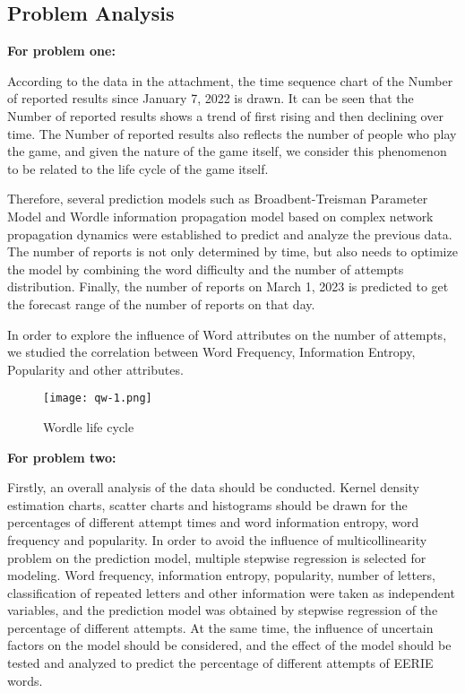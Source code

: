 \documentclass{mcmthesis}
\begin{document}
\subsection{Problem Analysis}

\textbf {For problem one:}

According to the data in the attachment, the time sequence chart of the Number of reported results since January 7, 2022 is drawn. It can be seen that the Number of reported results shows a trend of first rising and then declining over time. The Number of reported results also reflects the number of people who play the game, and given the nature of the game itself, we consider this phenomenon to be related to the life cycle of the game itself.

Therefore, several prediction models such as Broadbent-Treisman Parameter Model and Wordle information propagation model based on complex network propagation dynamics were established to predict and analyze the previous data. The number of reports is not only determined by time, but also needs to optimize the model by combining the word difficulty and the number of attempts distribution. Finally, the number of reports on March 1, 2023 is predicted to get the forecast range of the number of reports on that day.

In order to explore the influence of Word attributes on the number of attempts, we studied the correlation between Word Frequency, Information Entropy, Popularity and other attributes.
\begin{figure}[H]
	\centering
	\texttt{[image: qw-1.png]}
	\caption{\small Wordle life cycle}
\end{figure}

\textbf {For problem two:}

Firstly, an overall analysis of the data should be conducted. Kernel density estimation charts, scatter charts and histograms should be drawn for the percentages of different attempt times and word information entropy, word frequency and popularity. In order to avoid the influence of multicollinearity problem on the prediction model, multiple stepwise regression is selected for modeling. Word frequency, information entropy, popularity, number of letters, classification of repeated letters and other information were taken as independent variables, and the prediction model was obtained by stepwise regression of the percentage of different attempts. At the same time, the influence of uncertain factors on the model should be considered, and the effect of the model should be tested and analyzed to predict the percentage of different attempts of EERIE words.
\end{document}
